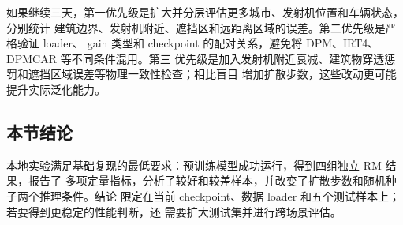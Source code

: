 如果继续三天，第一优先级是扩大并分层评估更多城市、发射机位置和车辆状态，分别统计
建筑边界、发射机附近、遮挡区和远距离区域的误差。第二优先级是严格验证 loader、
gain 类型和 checkpoint 的配对关系，避免将 DPM、IRT4、DPMCAR 等不同条件混用。第三
优先级是加入发射机附近衰减、建筑物穿透惩罚和遮挡区域误差等物理一致性检查；相比盲目
增加扩散步数，这些改动更可能提升实际泛化能力。

\subsection{本节结论}

本地实验满足基础复现的最低要求：预训练模型成功运行，得到四组独立 RM 结果，报告了
多项定量指标，分析了较好和较差样本，并改变了扩散步数和随机种子两个推理条件。结论
限定在当前 checkpoint、数据 loader 和五个测试样本上；若要得到更稳定的性能判断，还
需要扩大测试集并进行跨场景评估。
